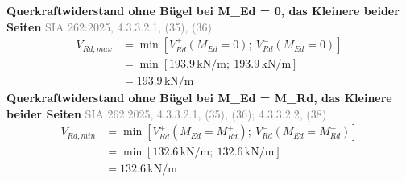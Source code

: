 \documentclass[11pt,a4paper]{article}
\newcommand{\normref}[1]{{\small\textcolor{gray}{#1}}}
\begin{document}
\noindent\textbf{Querkraftwiderstand ohne Bügel bei M\_Ed = 0, das Kleinere beider Seiten} \hfill \normref{SIA 262:2025, 4.3.3.2.1, (35), (36)}
\begin{equation*}
\begin{aligned}
  V_{Rd,max} &= \min\left[V_{Rd}^{+}(M_{Ed} = 0);\ V_{Rd}^{-}(M_{Ed} = 0)\right] \\
  &= \min\left[193.9\,\mathrm{kN}/\mathrm{m};\ 193.9\,\mathrm{kN}/\mathrm{m}\right] \\
  &= 193.9\,\mathrm{kN}/\mathrm{m}
\end{aligned}
\end{equation*}
\noindent\textbf{Querkraftwiderstand ohne Bügel bei M\_Ed = M\_Rd, das Kleinere beider Seiten} \hfill \normref{SIA 262:2025, 4.3.3.2.1, (35), (36); 4.3.3.2.2, (38)}
\begin{equation*}
\begin{aligned}
  V_{Rd,min} &= \min\left[V_{Rd}^{+}(M_{Ed} = M_{Rd}^{+});\ V_{Rd}^{-}(M_{Ed} = M_{Rd}^{-})\right] \\
  &= \min\left[132.6\,\mathrm{kN}/\mathrm{m};\ 132.6\,\mathrm{kN}/\mathrm{m}\right] \\
  &= 132.6\,\mathrm{kN}/\mathrm{m}
\end{aligned}
\end{equation*}
\end{document}
